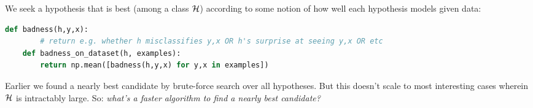 


  We seek a hypothesis that is best (among a class $\mathcal{H}$) according to some
  notion of how well each hypothesis models given data:
  \begin{lstlisting}[language=Python, basicstyle=\footnotesize\ttfamily]
    def badness(h,y,x):
        # return e.g. whether h misclassifies y,x OR h's surprise at seeing y,x OR etc
    def badness_on_dataset(h, examples):
        return np.mean([badness(h,y,x) for y,x in examples])
  \end{lstlisting}

  Earlier we found a nearly best candidate by brute-force search over all
  hypotheses.  But this doesn't scale to most interesting cases wherein $\mathcal{H}$
  is intractably large.
  So: \emph{what's a faster algorithm to find a nearly best candidate?}

